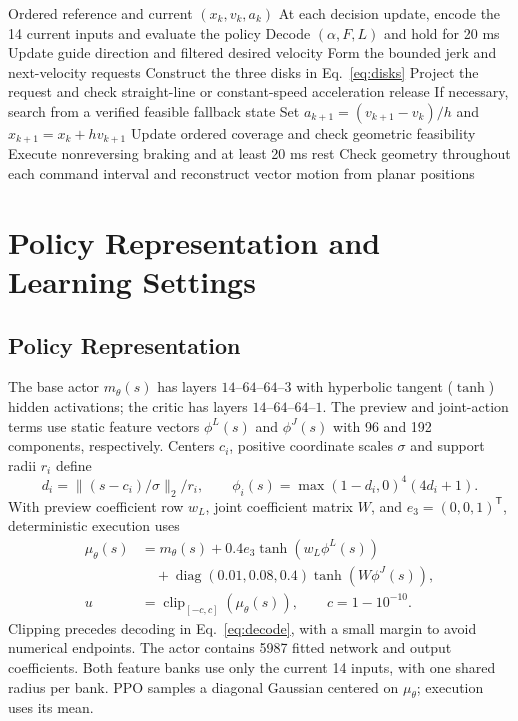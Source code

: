\documentclass[preprint,12pt,nonatbib]{elsarticle}
\begin{document}
\begin{algorithm}[H]
\caption{Complete execution with KCM constraints}
\label{alg:kcm}
\begin{algorithmic}[1]
\Require Ordered reference and current $(x_k,v_k,a_k)$
\State At each decision update, encode the 14 current inputs and evaluate the policy
\State Decode $(\alpha,F,L)$ and hold for 20 ms
\State Update guide direction and filtered desired velocity
\State Form the bounded jerk and next-velocity requests
\State Construct the three disks in Eq.~\eqref{eq:disks}
\State Project the request and check straight-line or constant-speed acceleration release
\State If necessary, search from a verified feasible fallback state
\State Set $a_{k+1}=(v_{k+1}-v_k)/h$ and $x_{k+1}=x_k+h v_{k+1}$
\State Update ordered coverage and check geometric feasibility
\EndFor
\EndWhile
{}
\State Execute nonreversing braking and at least 20 ms rest
\EndIf
\State Check geometry throughout each command interval and reconstruct vector motion from planar positions
\end{algorithmic}
\end{algorithm}

\section{Policy Representation and Learning Settings}
\label{app:learning}
\setcounter{table}{0}
\subsection{Policy Representation}
The base actor $m_\theta(s)$ has layers $14$--$64$--$64$--$3$ with hyperbolic tangent ($\tanh$) hidden activations; the critic has layers $14$--$64$--$64$--$1$. The preview and joint-action terms use static feature vectors $\phi^L(s)$ and $\phi^J(s)$ with 96 and 192 components, respectively. Centers $c_i$, positive coordinate scales $\sigma$ and support radii $r_i$ define
\begin{equation}
d_i=\|(s-c_i)/\sigma\|_2/r_i,\qquad
\phi_i(s)=\max(1-d_i,0)^4(4d_i+1).
\end{equation}
With preview coefficient row $w_L$, joint coefficient matrix $W$, and $e_3=(0,0,1)^{\mathsf T}$, deterministic execution uses
\begin{equation}
\begin{split}
\mu_\theta(s)&=m_\theta(s)+0.4e_3\tanh(w_L\phi^L(s))\\
&\quad+\operatorname{diag}(0.01,0.08,0.4)\tanh(W\phi^J(s)),\\
u&=\operatorname{clip}_{[-c,c]}(\mu_\theta(s)),\qquad c=1-10^{-10}.
\end{split}
\end{equation}
Clipping precedes decoding in Eq.~\eqref{eq:decode}, with a small margin to avoid numerical endpoints. The actor contains 5987 fitted network and output coefficients. Both feature banks use only the current 14 inputs, with one shared radius per bank. PPO samples a diagonal Gaussian centered on $\mu_\theta$; execution uses its mean.
\end{document}
